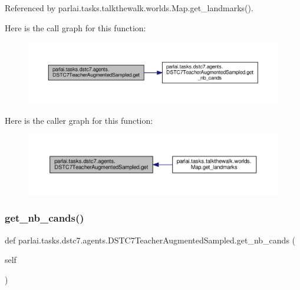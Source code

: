 Referenced by parlai.\+tasks.\+talkthewalk.\+worlds.\+Map.\+get\+\_\+landmarks().

Here is the call graph for this function\+:
\nopagebreak
\begin{figure}[H]
\begin{center}
\leavevmode
\includegraphics[width=350pt]{classparlai_1_1tasks_1_1dstc7_1_1agents_1_1DSTC7TeacherAugmentedSampled_a0df2da11ff943988cb4eb01dab6354c8_cgraph}
\end{center}
\end{figure}
Here is the caller graph for this function\+:
\nopagebreak
\begin{figure}[H]
\begin{center}
\leavevmode
\includegraphics[width=350pt]{classparlai_1_1tasks_1_1dstc7_1_1agents_1_1DSTC7TeacherAugmentedSampled_a0df2da11ff943988cb4eb01dab6354c8_icgraph}
\end{center}
\end{figure}
\mbox{\label{classparlai_1_1tasks_1_1dstc7_1_1agents_1_1DSTC7TeacherAugmentedSampled_a8be3cd7226a4c0c61fe422cb47d26ccc}} 
\subsubsection{\texorpdfstring{get\+\_\+nb\+\_\+cands()}{get\_nb\_cands()}}
{\footnotesize\ttfamily def parlai.\+tasks.\+dstc7.\+agents.\+D\+S\+T\+C7\+Teacher\+Augmented\+Sampled.\+get\+\_\+nb\+\_\+cands (\begin{DoxyParamCaption}\item[{}]{self }\end{DoxyParamCaption})}



